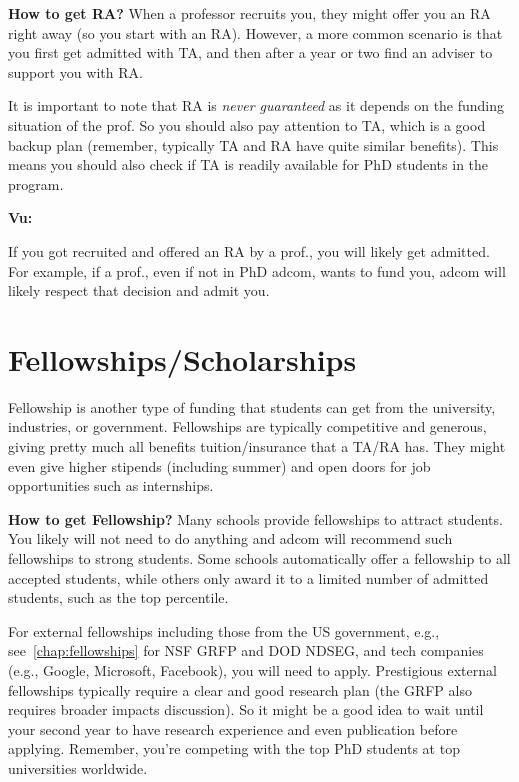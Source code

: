 \documentclass[oneside,11pt,dvipsnames]{book}
\newenvironment{commentbox}[1][]{
  \small
  \begin{mybox}
    {\small \textbf{#1}}
  }{
  \end{mybox}
}
\begin{document}
\textbf{How to get RA?} When a professor recruits you, they might offer you an RA right away (so you start with an RA).  However, a more common scenario is that you first get admitted with TA, and then after a year or two find an adviser to support you with RA.

It is important to note that RA is \emph{never guaranteed} as it depends on the funding situation of the prof. So you should also pay attention to TA, which is a good backup plan (remember, typically TA and RA have quite similar benefits). This means you should also check if TA is readily available for PhD students in the program.


\begin{commentbox}[Vu:]
  If you got recruited and offered an RA by a prof., you will likely get admitted.  For example, if a prof., even if not in PhD adcom, wants to fund you, adcom will likely respect that decision and admit you.
\end{commentbox}

\section{Fellowships/Scholarships}\label{sec:fellowships}

Fellowship is another type of funding that students can get from the university, industries, or government.
Fellowships are typically competitive and generous, giving pretty much all benefits tuition/insurance that a TA/RA has.  They might even give higher stipends (including summer) and open doors for job opportunities such as internships.

\textbf{How to get Fellowship?}   Many schools provide fellowships to attract students. You likely will not need to do anything and adcom will recommend such fellowships to strong students. Some schools automatically offer a fellowship to all accepted students, while others only award it to a limited number of admitted students, such as the top percentile.

For external fellowships including those from the US government, e.g., see~\autoref{chap:fellowships} for NSF GRFP and  DOD NDSEG, and tech companies (e.g., Google, Microsoft, Facebook), you will need to apply.  %
Prestigious external fellowships typically require a clear and good research plan (the GRFP also requires broader impacts discussion). So it might be a good idea to wait until your second year to have research experience and even publication before applying. Remember, you're competing with the top PhD students at top universities worldwide.
\end{document}
